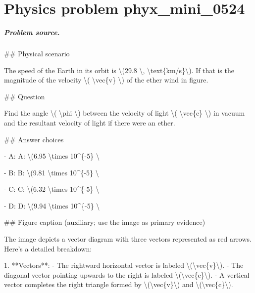 
\chapter{Physics problem phyx\_mini\_0524}
\label{ch:PhyXMiniProblems_problem_phyx_mini_0524}

\paragraph{Problem source.}
\#\# Physical scenario

The speed of the Earth in its orbit is \textbackslash{}(29.8 \textbackslash{}, \textbackslash{}text\{km/s\}\textbackslash{}). If that is the magnitude of the velocity \textbackslash{}( \textbackslash{}vec\{v\} \textbackslash{}) of the ether wind in figure.

\#\# Question

Find the angle \textbackslash{}( \textbackslash{}phi \textbackslash{}) between the velocity of light \textbackslash{}( \textbackslash{}vec\{c\} \textbackslash{}) in vacuum and the resultant velocity of light if there were an ether.

\#\# Answer choices

- A: A: \textbackslash{}(6.95 \textbackslash{}times 10\textasciicircum{}\{-5\} \textbackslash{}

- B: B: \textbackslash{}(9.81 \textbackslash{}times 10\textasciicircum{}\{-5\} \textbackslash{}

- C: C: \textbackslash{}(6.32 \textbackslash{}times 10\textasciicircum{}\{-5\} \textbackslash{}

- D: D: \textbackslash{}(9.94 \textbackslash{}times 10\textasciicircum{}\{-5\} \textbackslash{}

\#\# Figure caption (auxiliary; use the image as primary evidence)

The image depicts a vector diagram with three vectors represented as red arrows. Here's a detailed breakdown:

1. **Vectors**:
   - The rightward horizontal vector is labeled \textbackslash{}(\textbackslash{}vec\{v\}\textbackslash{}).
   - The diagonal vector pointing upwards to the right is labeled \textbackslash{}(\textbackslash{}vec\{c\}\textbackslash{}).
   - A vertical vector completes the right triangle formed by \textbackslash{}(\textbackslash{}vec\{v\}\textbackslash{}) and \textbackslash{}(\textbackslash{}vec\{c\}\textbackslash{}).

